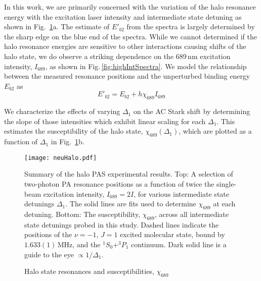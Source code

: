 In this work, we are primarily concerned with the variation of the halo resonance energy with the excitation laser intensity and intermediate state detuning as shown in Fig.\ \ref{fig:neuHalo}a.
The estimate of $E'_{b2}$ from the spectra is largely determined by the sharp edge on the blue end of the spectra.
While we cannot determined if the halo resonance energies are sensitive to other interactions causing shifts of the halo state, we do observe a striking dependence on the 689\,nm excitation intensity, $I_{689}$, as shown in Fig.\,\ref{fig:highIntSpectra}.
We model the relationship between the measured resonance positions and the unperturbed binding energy $E_{b2}$ as
\begin{equation}\label{Eq:4GlobalFit}
	E'_{b2} = E_{b2} + h\chi_{689}I_{689}
\end{equation}

We characterize the effects of varying $\Delta_1$ on the AC Stark shift by determining the slope of those intensities which exhibit linear scaling for each $\Delta_1$.
This estimates the susceptibility of the halo state, $\chi_{689}(\Delta_1)$, which are plotted as a function of $\Delta_1$ in Fig.\ \ref{fig:neuHalo}b.
	\begin{figure}
	\centerline{
	  \texttt{[image: neuHalo.pdf]}}
	  \caption{Halo state resonances and susceptibilities, $\chi_{689}$}{Summary of the halo PAS experimental results. Top: A selection of two-photon PA resonance positions as a function of twice the single-beam excitation intensity, $I_{689} = 2I$, for various intermediate state detunings $\Delta_1$. The solid lines are fits used to determine $\chi_{689}$ at each detuning. Bottom: The susceptibility, $\chi_{689}$, across all intermediate state detunings probed in this study. Dashed lines indicate the positions of the $\nu=-1$, $J=1$ excited molecular state, bound by $1.633(1)$\,MHz, and the $^1S_0$+$^3P_1$ continuum. Dark solid line is a guide to the eye $\propto 1/\Delta_1$.}
	   \label{fig:neuHalo}
	\end{figure}
	
%	
	
